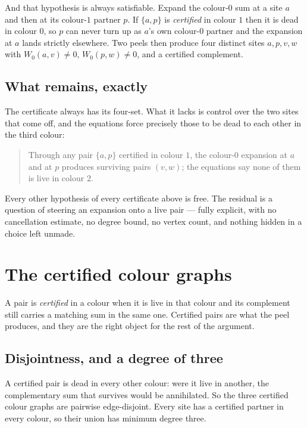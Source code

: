\documentclass[11pt]{article}
\theoremstyle{definition}
\theoremstyle{remark}
\begin{document}
And that hypothesis is always satisfiable. Expand the colour-$0$ sum at a site $a$ and
then at its colour-$1$ partner $p$. If $\{a,p\}$ is \emph{certified} in colour $1$ then it
is dead in colour $0$, so $p$ can never turn up as $a$'s own colour-$0$ partner and the
expansion at $a$ lands strictly elsewhere. Two peels then produce four distinct sites
$a,p,v,w$ with $W_0(a,v)\neq 0$, $W_0(p,w)\neq 0$, and a certified complement.

\subsection*{What remains, exactly}

The certificate always has its four-set. What it lacks is control over the two sites that
come off, and the equations force precisely those to be dead to each other in the third
colour:

\begin{quote}
Through any pair $\{a,p\}$ certified in colour $1$, the colour-$0$ expansion at $a$ and at
$p$ produces surviving pairs $(v,w)$; the equations say none of them is live in colour $2$.
\end{quote}

Every other hypothesis of every certificate above is free. The residual is a question of
steering an expansion onto a live pair --- fully explicit, with no cancellation estimate,
no degree bound, no vertex count, and nothing hidden in a choice left unmade.

\section{The certified colour graphs}\label{sec:certified}

A pair is \emph{certified} in a colour when it is live in that colour and its complement still
carries a matching sum in the same one. Certified pairs are what the peel produces, and they are
the right object for the rest of the argument.

\subsection*{Disjointness, and a degree of three}

A certified pair is dead in every other colour: were it live in another, the complementary sum
that survives would be annihilated. So the three certified colour graphs are pairwise
edge-disjoint. Every site has a certified partner in every colour, so their union has minimum
degree three.
\end{document}
